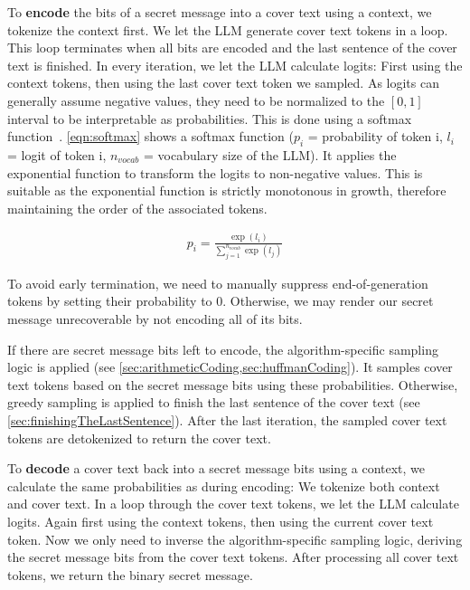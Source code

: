 To \textbf{encode} the bits of a secret message into a cover text using a context, we tokenize the context first. We let the \gls{LLM} generate cover text tokens in a loop. This loop terminates when all bits are encoded and the last sentence of the cover text is finished. In every iteration, we let the \gls{LLM} calculate logits: First using the context tokens, then using the last cover text token we sampled. As logits can generally assume negative values, they need to be normalized to the $ [0, 1] $ interval to be interpretable as probabilities. This is done using a softmax function~\cite{turnerIntroductionTransformers2024}. \cref{eqn:softmax} shows a softmax function ($p_i$ = probability of token i, $l_i$ = logit of token i, $n_{vocab}$ = vocabulary size of the \gls{LLM}). It applies the exponential function to transform the logits to non-negative values. This is suitable as the exponential function is strictly monotonous in growth, therefore maintaining the order of the associated tokens.

\begin{align}
	p_i = \frac{\exp(l_i)}{\sum_{j=1}^{n_{vocab}} \exp(l_j)}
	\label{eqn:softmax}
\end{align}

To avoid early termination, we need to manually suppress end-of-generation tokens by setting their probability to 0. Otherwise, we may render our secret message unrecoverable by not encoding all of its bits.

If there are secret message bits left to encode, the algorithm-specific sampling logic is applied (see \cref{sec:arithmeticCoding,sec:huffmanCoding}). It samples cover text tokens based on the secret message bits using these probabilities. Otherwise, greedy sampling is applied to finish the last sentence of the cover text (see \cref{sec:finishingTheLastSentence}). After the last iteration, the sampled cover text tokens are detokenized to return the cover text.

To \textbf{decode} a cover text back into a secret message bits using a context, we calculate the same probabilities as during encoding: We tokenize both context and cover text. In a loop through the cover text tokens, we let the \gls{LLM} calculate logits. Again first using the context tokens, then using the current cover text token. Now we only need to inverse the algorithm-specific sampling logic, deriving the secret message bits from the cover text tokens. After processing all cover text tokens, we return the binary secret message.

